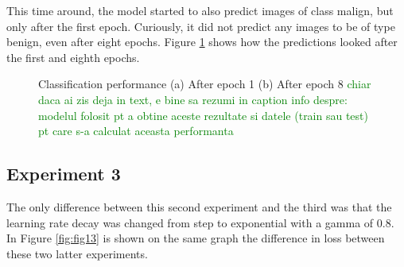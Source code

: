 This time around, the model started to also predict images of class malign, but only after the first epoch. Curiously, it did not predict any images to be of type benign, even after eight epochs. Figure \ref{fig:fig11} shows how the predictions looked after the first and eighth epochs.

\begin{figure}[!ht]
    \caption{Classification performance (a) After epoch 1 (b) After epoch 8
    \textcolor{green}{chiar daca ai zis deja in text, e bine sa rezumi in caption info despre: modelul folosit pt a obtine aceste rezultate si datele (train sau test) pt care s-a calculat aceasta performanta}
    }
    \label{fig:fig11}
\end{figure}

\subsection{Experiment 3}

The only difference between this second experiment and the third was that the learning rate decay was changed from step to exponential with a gamma of 0.8. In Figure \ref{fig:fig13} is shown on the same graph the difference in loss between these two latter experiments.

